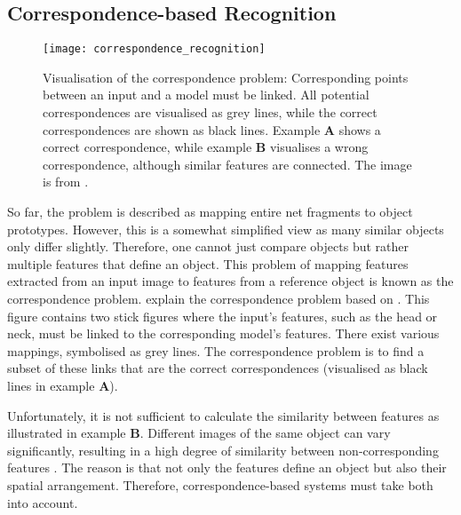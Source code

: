\subsection{Correspondence-based Recognition}
\begin{figure}[h]
    \centering
    \texttt{[image: correspondence\_recognition]}
    \caption[The visual correspondence problem]{Visualisation of the correspondence problem: Corresponding points between an input and a model must be linked. All potential correspondences are visualised as grey lines, while the correct correspondences are shown as black lines. Example $\boldsymbol{A}$ shows a correct correspondence, while example $\boldsymbol{B}$ visualises a wrong correspondence, although similar features are connected. The image is from \cite{wolfrum_recurrent_2008}.}
\end{figure}

So far, the problem is described as mapping entire net fragments to object prototypes.
However, this is a somewhat simplified view as many similar objects only differ slightly.
Therefore, one cannot just compare objects but rather multiple features that define an object.
This problem of mapping features extracted from an input image to features from a reference object is known as the correspondence problem.
 explain the correspondence problem based on . This figure contains two stick figures where the input's features, such as the head or neck, must be linked to the corresponding model's features.
There exist various mappings, symbolised as grey lines.
The correspondence problem is to find a subset of these links that are the correct correspondences (visualised as black lines in example $\boldsymbol{A}$). 

Unfortunately, it is not sufficient to calculate the similarity between features as illustrated in 
 example $\boldsymbol{B}$. Different images of the same object can vary significantly, resulting in a high degree of similarity between non-corresponding features . The reason is that not only the features define an object but also their spatial arrangement. Therefore, correspondence-based systems must take both into account.

